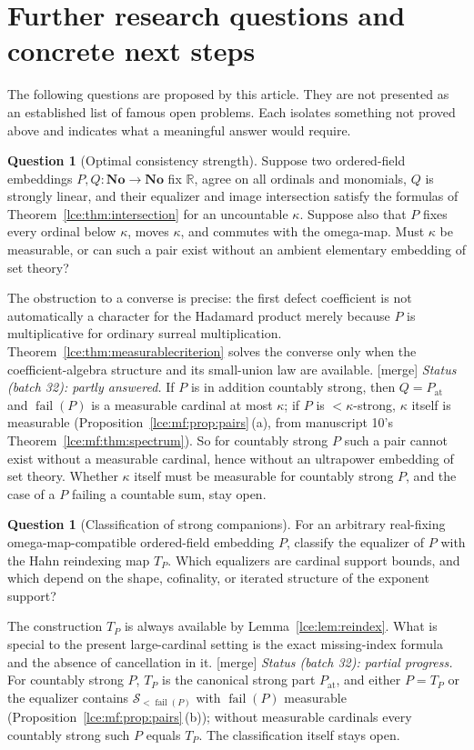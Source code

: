 \documentclass[11pt,letterpaper]{article}
\numberwithin{equation}{section}
\theoremstyle{definition}
\newtheorem{question}[theorem]{Question}
\theoremstyle{remark}
\newcommand{\No}{\mathbf{No}}
\newcommand{\R}{\mathbb R}
\newcommand{\thref}[1]{Theorem~\ref{#1}}
\newcommand{\prref}[1]{Proposition~\ref{#1}}
\newcommand{\leref}[1]{Lemma~\ref{#1}}
\newcommand{\mergetag}{\textup{\textsf{\small[merge]}}}%
\newcommand{\at}{\mathrm{at}}
\newcommand{\fail}{\operatorname{fail}}
\begin{document}
\section{Further research questions and concrete next steps}\label{lce:sec:questions}

The following questions are proposed by this article. They are not
presented as an established list of famous open problems. Each isolates
something not proved above and indicates what a meaningful answer would
require.

\begin{question}[Optimal consistency strength]\label{lce:q:strength}
Suppose two ordered-field embeddings $P,Q:\No\to\No$ fix $\R$, agree
on all ordinals and monomials, $Q$ is strongly linear, and their equalizer
and image intersection satisfy the formulas of
\thref{lce:thm:intersection} for an uncountable $\kappa$. Suppose also that
$P$ fixes every ordinal below $\kappa$, moves $\kappa$, and commutes with
the omega-map. Must $\kappa$ be measurable, or can such a pair exist
without an ambient elementary embedding of set theory?
\end{question}
The obstruction to a converse is precise: the first defect coefficient
is not automatically a character for the Hadamard product merely because
$P$ is multiplicative for ordinary surreal multiplication.
\thref{lce:thm:measurablecriterion} solves the converse only when the
coefficient-algebra structure and its small-union law are available.
\mergetag{} \emph{Status (batch 32): partly answered.} If $P$ is in
addition countably strong, then $Q=P_{\at}$ and $\fail(P)$ is a measurable
cardinal at most $\kappa$; if $P$ is ${<}\kappa$-strong, $\kappa$ itself is
measurable (\prref{lce:mf:prop:pairs}\,(a), from manuscript 10's
\thref{lce:mf:thm:spectrum}). So for countably strong $P$ such a pair cannot
exist without a measurable cardinal, hence without an ultrapower embedding
of set theory. Whether $\kappa$ itself must be measurable for countably
strong $P$, and the case of a $P$ failing a countable sum, stay open.

\begin{question}[Classification of strong companions]\label{lce:q:classification}
For an arbitrary real-fixing omega-map-compatible ordered-field embedding
$P$, classify the equalizer of $P$ with the Hahn reindexing map $T_P$.
Which equalizers are cardinal support bounds, and which depend on the
shape, cofinality, or iterated structure of the exponent support?
\end{question}
The construction $T_P$ is always available by \leref{lce:lem:reindex}.
What is special to the present large-cardinal setting is the exact
missing-index formula and the absence of cancellation in it.
\mergetag{} \emph{Status (batch 32): partial progress.} For countably strong
$P$, $T_P$ is the canonical strong part $P_{\at}$, and either $P=T_P$ or the
equalizer contains $\mathscr S_{<\fail(P)}$ with $\fail(P)$ measurable
(\prref{lce:mf:prop:pairs}\,(b)); without measurable cardinals every
countably strong such $P$ equals $T_P$. The classification itself stays
open.
\end{document}

